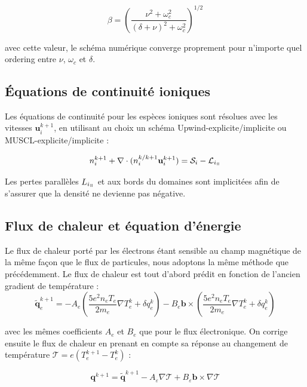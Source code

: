\begin{refsection}
\begin{equation}
\label{3-eqMvtPonderee}
\beta=\left(\frac{\nu^2+\omega_c^2}{(\delta+\nu)^2+\omega_c^2}\right)^{1/2}
\end{equation}

avec cette valeur, le schéma numérique converge proprement pour n'importe quel
ordering entre $\nu$, $\omega_c$ et $\delta$.

\subsection{Équations de continuité ioniques}
Les équations de continuité pour les espèces ioniques sont résolues avec les
vitesses $\mathbf u_i^{k+1}$, en utilisant au choix un schéma
Upwind-explicite/implicite ou MUSCL-explicite/implicite :

\begin{equation}
n_i^{k+1}+\nabla\cdot(n_i^{k/k+1}\mathbf u_i^{k+1})=\mathcal S_i-\mathcal
L_{i_\para}
\end{equation}

Les pertes parallèles $L_{i_\para}$ et aux bords du
domaines sont implicitées afin de s'assurer que la densité ne devienne pas
négative.

\subsection{Flux de chaleur et équation d'énergie}

Le flux de chaleur porté par les électrons étant sensible au champ magnétique de
la même façon que le flux de particules, nous adoptons la même méthode que
précédemment. Le flux de chaleur est tout d'abord prédit en fonction de
l'ancien gradient de température :
\begin{equation}
\label{3-eqChaleurPonderee}
\tilde{\mathbf{q}}_e^{k+1}=-A_e(
\frac{5e^2n_eT_e}{2m_e}\nabla T_e^k+\delta q_e^k)-B_e\mathbf
b\times(\frac{5e^2n_eT_e}{2m_e}\nabla T_e^k +\delta q_e^k)
\end{equation}

avec les mêmes coefficients $A_e$ et $B_e$ que pour le flux électronique. On
corrige ensuite le flux de chaleur en prenant en compte sa réponse au changement
de température $\mathcal T=e(T_e^{k+1}-T_e^k)$ :

\begin{equation}
\label{3-eqCorrectionVitesse}
\mathbf q^{k+1} = \tilde{\mathbf q}^{k+1}-A_\varepsilon\nabla
\mathcal T+B_\varepsilon\mathbf b\times\nabla
\mathcal T
\end{equation}


\end{refsection}
